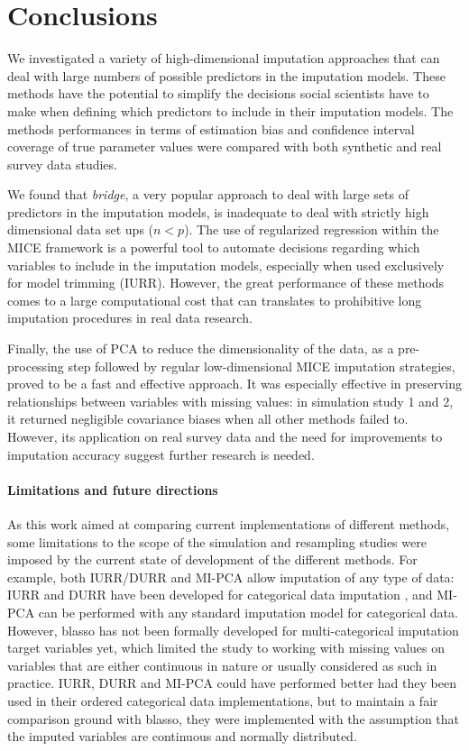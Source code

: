 \section{Conclusions}

	We investigated a variety of high-dimensional imputation approaches that can deal with large numbers 
	of possible predictors in the imputation models.
	These methods have the potential to simplify the decisions social scientists have to make when defining
	which predictors to include in their imputation models.
	The methods performances in terms of estimation bias and confidence interval coverage of true parameter values were 
	compared with both synthetic and real survey data studies.

	We found that \emph{bridge}, a very popular approach to deal with large sets of predictors in the imputation models,
	is inadequate to deal with strictly high dimensional data set ups ($n < p$).
	The use of regularized regression within the MICE framework is a powerful tool to automate decisions regarding which
	variables to include in the imputation models, especially when used exclusively for model trimming (IURR).
	However, the great performance of these methods comes to a large computational cost that can translates to 
	prohibitive long imputation procedures in real data research.

	Finally, the use of PCA to reduce the dimensionality of the data, as a pre-processing step followed by regular 
	low-dimensional MICE imputation strategies, proved to be a fast and effective approach.
	It was especially effective in preserving relationships between variables with missing values:
	in simulation study 1 and 2, it returned negligible covariance biases when all other methods failed to.
	However, its application on real survey data and the need for improvements to imputation accuracy suggest 
	further research is needed.

\paragraph{Limitations and future directions}

	As this work aimed at comparing current implementations of different methods, some limitations
	to the scope of the simulation and resampling studies were imposed by the current state of development of 
	the different methods.
	For example, both IURR/DURR and MI-PCA allow imputation of any type of data:
	IURR and DURR have been developed for categorical data imputation \citep{dengEtAl:2016},
	and MI-PCA can be performed with any standard imputation model for categorical data.
	However, blasso has not been formally developed for multi-categorical imputation target variables yet, 
	which limited the study to working with missing values on variables that are either continuous in nature 
	or usually considered as such in practice.
	IURR, DURR and MI-PCA could have performed better had they been used in their ordered categorical data
	implementations, but to maintain a fair comparison ground with blasso, they were implemented with the
	assumption that the imputed variables are continuous and normally distributed.

